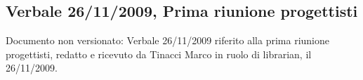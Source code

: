 \subsection{Verbale 26/11/2009, Prima riunione progettisti}
Documento non versionato: Verbale 26/11/2009 riferito alla prima riunione
progettisti, redatto e ricevuto da Tinacci Marco in ruolo di librarian, il
26/11/2009.
